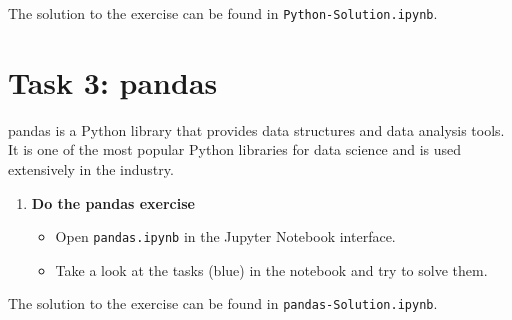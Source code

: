 \documentclass[
english,
smallborders
]{../i6prcsht}
\begin{document}
\begin{solution}
	The solution to the exercise can be found in \texttt{Python-Solution.ipynb}.
\end{solution}

\section*{Task 3: pandas}

pandas is a Python library that provides data structures and data analysis tools. It is one of the most popular Python libraries for data science and is used extensively in the industry.

\begin{enumerate}
	\item \textbf{Do the pandas exercise} %

	      \begin{itemize}
		      \item Open \texttt{pandas.ipynb} in the Jupyter Notebook interface.
		      \item Take a look at the tasks (blue) in the notebook and try to solve them.
	      \end{itemize}
\end{enumerate}

\begin{solution}
	The solution to the exercise can be found in \texttt{pandas-Solution.ipynb}.
\end{solution}
\end{document}
